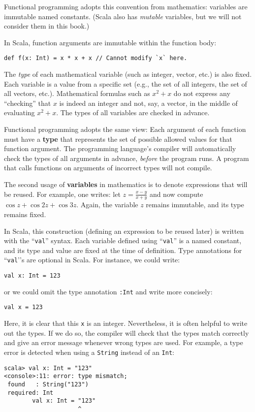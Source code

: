 Functional programming adopts this convention from mathematics: variables
are immutable named constants. (Scala also has \emph{mutable} variables,
but we will not consider them in this book.)

In Scala, function arguments are immutable within the function body:
\begin{lstlisting}
def f(x: Int) = x * x + x // Cannot modify `x` here.
\end{lstlisting}

The \emph{type} of each mathematical variable (such as integer, vector,
etc.) is also fixed. Each variable is a value from a specific set
(e.g., the set of all integers, the set of all vectors, etc.). Mathematical
formulas such as $x^{2}+x$ do not express any \textsf{``}checking\textsf{''} that
$x$ is indeed an integer and not, say, a vector, in the middle of
evaluating $x^{2}+x$. The types of all variables are checked in advance.

Functional programming adopts the same view: Each argument of each
function must have a \textbf{type} that represents the
set of possible allowed values for that function argument. The programming
language\textsf{'}s compiler will automatically check the types of all arguments
in advance, \emph{before} the program runs. A program that calls functions
on arguments of incorrect types will not compile.

The second usage of \textbf{variables} in mathematics
is to denote expressions that will be reused. For example, one writes:
let $z=\frac{x-y}{x+y}$ and now compute $\cos z+\cos2z+\cos3z$.
Again, the variable $z$ remains immutable, and its type remains fixed.

In Scala, this construction (defining an expression to be reused later)
is written with the \textsf{``}\lstinline!val!\textsf{''} syntax. Each variable defined
using \textsf{``}\lstinline!val!\textsf{''} is a named constant, and its type and
value are fixed at the time of definition. Type annotations for \textsf{``}\lstinline!val!'\textsf{'}s
are optional in Scala. For instance, we could write:
\begin{lstlisting}
val x: Int = 123
\end{lstlisting}
or we could omit the type annotation \lstinline!:Int! and write more
concisely:
\begin{lstlisting}
val x = 123
\end{lstlisting}
Here, it is clear that this \texttt{}\lstinline!x! is an integer.
Nevertheless, it is often helpful to write out the types. If we do
so, the compiler will check that the types match correctly and give
an error message whenever wrong types are used. For example, a type
error is detected when using a \lstinline!String! instead of an \lstinline!Int!:
\begin{lstlisting}
scala> val x: Int = "123"
<console>:11: error: type mismatch;
 found   : String("123")
 required: Int
        val x: Int = "123"
                     ^
\end{lstlisting}



